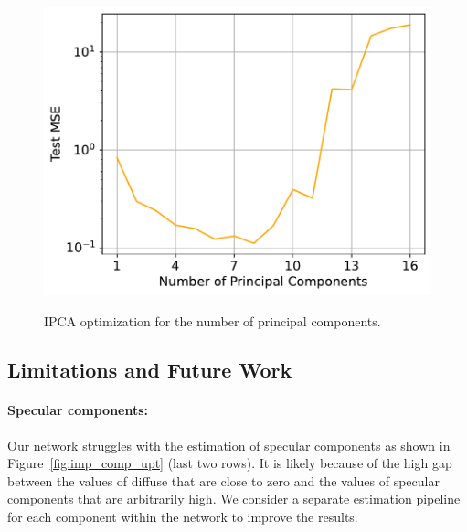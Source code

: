 \begin{figure}
  \centering

  {\includegraphics[width=0.5\linewidth]{Chapters/hyperbrdf-figs/ipca_opt_q_40_cropped.pdf}}
   \caption{IPCA optimization for the number of principal components.}
   \label{fig:ipca_opt}
\end{figure}

\begin{table}[ht]
    \centering
    \caption{Average mean squared errors for varying latent space dimensions (first row) and number of principal components (second row)}

    \label{table: z_abl}
\end{table}


\subsection{Limitations and Future Work}\label{sec:limits}
\paragraph{Specular components:} Our network struggles with the estimation of specular components as shown in Figure~\ref{fig:imp_comp_upt} (last two rows). It is likely because of the high gap between the values of diffuse that are close to zero and the values of specular components that are arbitrarily high. We consider a separate estimation pipeline for each component within the network to improve the results.


